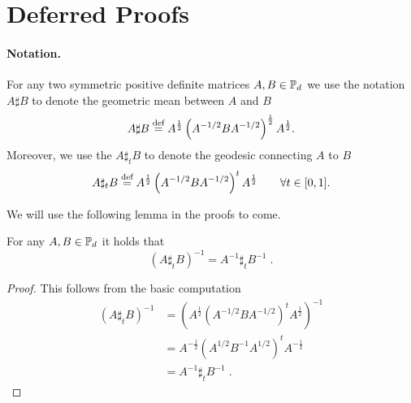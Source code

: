 \documentclass[twoside,11pt]{article}
\begin{document}

\vskip 0.2in


\newpage

\appendix
\section{Deferred Proofs}
\label{app:theorem}
\paragraph{Notation.} For any two symmetric positive definite matrices $A, B \in \mathbb{P}_d$ we use the notation $A \sharp B$ to denote the geometric mean between $A$ and $B$
\[
A \sharp B \stackrel{\text{def}}{=} A^{\frac{1}{2}}\left(A^{-1/2} B A^{-1/2}\right)^\frac{1}{2}A^{\frac{1}{2}}.
\]
Moreover, we use the $A \sharp_t B$ to denote the geodesic connecting $A$ to $B$
\[
A \sharp_t B \stackrel{\text{def}}{=} A^{\frac{1}{2}}\left(A^{-1/2} B A^{-1/2}\right)^t A^{\frac{1}{2}} \qquad \forall t \in [0,1].
\]

We will use the following lemma in the proofs to come. 

\begin{lemma}\label{lemma:inv_commute_sharp}
    For any $A, B \in \mathbb{P}_d$ it holds that
    \[
    \left(A \sharp_t B\right)^{-1} = A^{-1} \sharp_t B^{-1} \; .
    \] 
\end{lemma}
\begin{proof}
    This follows from the basic computation
    \begin{align*}
        \left(A \sharp_t B\right)^{-1} &= \left(A^{\frac{1}{2}}\left(A^{-1/2} B A^{-1/2}\right)^t A^{\frac{1}{2}} \right)^{-1} \\
        &= A^{-\frac{1}{2}}\left(A^{1/2} B^{-1} A^{1/2}\right)^t A^{-\frac{1}{2}}\\
        &= A^{-1} \sharp_t B^{-1} \;.
    \end{align*}
\end{proof}
\end{document}
